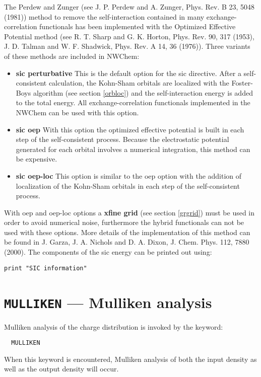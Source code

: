 The Perdew and Zunger (see J. P. Perdew and A. Zunger, Phys. Rev. B 23,
5048 (1981)) method to remove the self-interaction contained in many
exchange-correlation functionals has been implemented with the
Optimized Effective Potential method 
(see R. T. Sharp and G. K. Horton, Phys. Rev. 90, 317 (1953),
J. D. Talman and W. F. Shadwick, Phys. Rev. A 14, 36 (1976)). 
Three variants of these methods are included in NWChem:
\begin{itemize}
\item{\bf sic perturbative} This is the default option for the sic
directive. After a self-consistent calculation, the Kohn-Sham
orbitals are localized with the Foster-Boys algorithm (see section
\ref{orbloc}) and the self-interaction energy is added to the total energy. 
All exchange-correlation functionals implemented in the NWChem can be
used with this option.
\item{\bf sic oep} With this option the optimized effective potential is
built in each step of the self-consistent process. Because the electrostatic
potential generated for each orbital involves a numerical
integration, this method can be expensive.
\item{\bf sic oep-loc} This option is similar to the oep option with the
addition of localization of the Kohn-Sham orbitals in each step of the 
self-consistent process.
\end{itemize}
With oep and oep-loc options a {\bf xfine grid} (see section \ref{grgrid})
must be used in order to avoid numerical noise, furthermore the hybrid 
functionals can not be used with these options.  More details of the
implementation of this method can be found in 
J. Garza, J. A. Nichols and D. A. Dixon, J. Chem. Phys. 112, 7880 (2000). 
The components of the sic energy can be printed out using:

\begin{verbatim}
print "SIC information"
\end{verbatim}


\section{{\tt MULLIKEN} --- Mulliken analysis}
Mulliken analysis of the charge distribution is invoked by the keyword:
\begin{verbatim}
  MULLIKEN
\end{verbatim}
When this keyword is encountered, Mulliken analysis of both the input 
density as well as the output density will occur.

